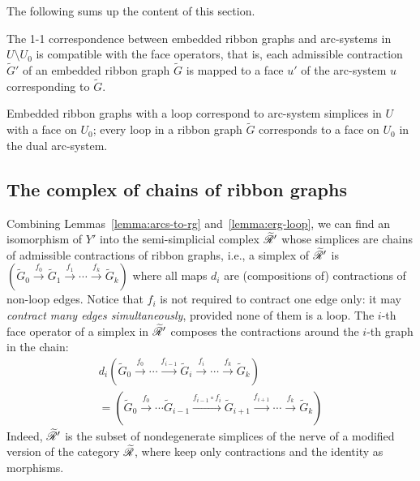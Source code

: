 The following sums up the content of this section.
\begin{lemma}
  \label{lemma:erg-loop}
  The 1-1 correspondence between embedded ribbon graphs and
  arc-systems in $U \setminus U_0$ is compatible with the face operators, that
  is, each admissible contraction $\tilde G'$ of an embedded ribbon
  graph $\tilde G$ is mapped to a face $u'$ of the arc-system $u$
  corresponding to $\tilde G$.

  Embedded ribbon graphs with a loop correspond to arc-system simplices
  in $U$ with a face on $U_0$; every loop in a ribbon graph $\tilde G$
  corresponds to a face on $U_0$ in the dual arc-system.
\end{lemma}


\subsection{The complex of chains of ribbon graphs}
\label{sec:chains}

Combining Lemmas~\ref{lemma:arcs-to-rg} and~\ref{lemma:erg-loop}, we
can find an isomorphism of $Y'$ into the semi-simplicial complex
$\mathscr{\widetilde R}_{}'$ whose simplices are chains of admissible contractions of
ribbon graphs, i.e., a simplex of $\mathscr{\widetilde R}_{}'$ is $({\tilde G}_0
\overset{f_0}\to {\tilde G}_1 \overset{f_1}\to \cdots \overset{f_k}\to {\tilde
  G}_k)$ where all maps $d_i$ are (compositions of) contractions of
non-loop edges.  Notice that $f_i$ is not required to contract one
edge only: it may \emph{contract many edges simultaneously}, provided
none of them is a loop.  The $i$-th face operator of a simplex in
$\mathscr{\widetilde R}_{}'$ composes the contractions around the $i$-th graph in the
chain:
\begin{multline}
  \label{eq:5}
  d_i({\tilde G}_0 \overset{f_0}\to \cdots \xrightarrow{f_{i-1}} {\tilde
    G}_i \overset{f_i}\to \cdots \overset{f_k}\to {\tilde G}_k) \\
  = ({\tilde G}_0 \overset{f_0}\to \cdots {\tilde
    G}_{i-1} \xrightarrow{f_{i-1} \circ f_i} {\tilde G_{i+1}} 
    \xrightarrow{f_{i+1}} \cdots \overset{f_k}\to {\tilde G}_k)
\end{multline}
Indeed, $\mathscr{\widetilde R}_{}'$ is the subset of nondegenerate simplices of the nerve
of a modified version of the category $\mathscr{\widetilde R}_{}$, where keep only
contractions and the identity as morphisms.

